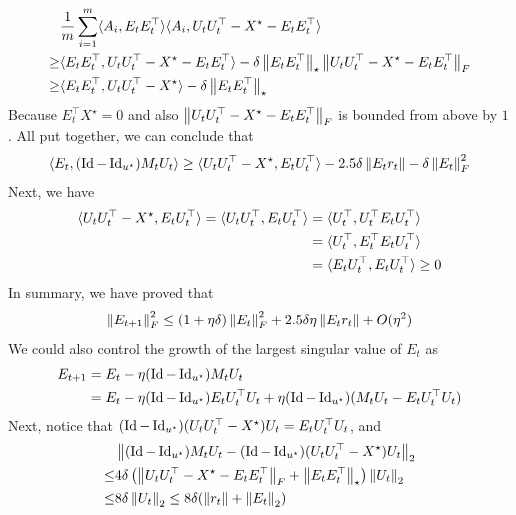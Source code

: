 \begin{align*}
    & \frac 1 m \sum_{i=1}^m \langle A_i, E_t E_t^{\top} \rangle \langle A_i, U_t U_t^{\top} - X^{\star} - E_t E_t^{\top} \rangle \\
    \ge& \langle E_t E_t^{\top}, U_t U_t^{\top} - X^{\star} - E_t E_t^{\top} \rangle - \delta \left\| E_t E_t^{\top} \right\|_{\star} \left\| U_t U_t^{\top} - X^{\star} - E_t E_t^{\top} \right\|_{F} \\
    \ge& \langle E_t E_t^{\top}, U_tU_t^{\top} - X^{\star} \rangle - \delta \left\| E_t E_t^{\top} \right\|_{\star}
\end{align*}
Because $E_t^{\top} X^{\star} = 0$ and also $\left\| U_t U_t^{\top} - X^{\star} - E_t E_t^{\top} \right\|_{F}$ is bounded from above by $1$.
All put together, we can conclude that
\begin{align*}
    \langle E_t, (\operatorname{Id} - \operatorname{Id}_{u^{\star}}) M_t U_t \rangle
    \ge \langle U_t U_t^{\top} - X^{\star}, E_t U_t^{\top} \rangle - 2.5\delta \left\| E_t r_t \right\| - \delta \left\| E_t \right\|_{F}^2
\end{align*}
Next, we have
\begin{align*}
    \langle U_t U_t^{\top} - X^{\star}, E_t U_t^{\top} \rangle
    = \langle U_t U_t^{\top}, E_t U_t^{\top} \rangle
    &= \langle U_t^{\top}, U_t^{\top} E_t U_t^{\top} \rangle \\
    &= \langle U_t^{\top}, E_t^{\top} E_t U_t^{\top} \rangle \\
    &= \langle E_t U_t^{\top}, E_t U_t^{\top} \rangle \ge 0
\end{align*}
In summary, we have proved that
\begin{align}
    \left\| E_{t+1} \right\|_{F}^2 \le (1 + \eta \delta) \left\| E_t \right\|_{F}^2 + 2.5\delta\eta \left\| E_t r_t \right\| + O(\eta^2)
\end{align}
We could also control the growth of the largest singular value of $E_t$ as
\begin{align}
    E_{t+1} &= E_t - \eta (\operatorname{Id} - \operatorname{Id}_{u^{\star}}) M_t U_t \\ 
    &= E_t - \eta (\operatorname{Id} - \operatorname{Id}_{u^{\star}}) E_t U_t^{\top} U_t + \eta(\operatorname{Id} - \operatorname{Id}_{u^{\star}}) (M_t U_t - E_t U_t^{\top} U_t)
\end{align}
Next, notice that $(\operatorname{Id} - \operatorname{Id}_{u^{\star}}) (U_t U_t^{\top} - X^{\star}) U_t = E_t U_t^{\top} U_t$, and
\begin{align*}
    & \left\| (\operatorname{Id} - \operatorname{Id}_{u^{\star}}) M_t U_t - (\operatorname{Id} - \operatorname{Id}_{u^{\star}}) (U_t U_t^{\top} - X^{\star}) U_t \right\|_{2} \\
    \le & 4 \delta \left(\left\| U_t U_t^{\top} - X^{\star} - E_t E_t^{\top} \right\|_{F} + \left\| E_t E_t^{\top} \right\|_{\star} \right) \left\| U_t \right\|_{2} \\
    \le & 8 \delta \left\| U_t \right\|_{2} \le 8 \delta (\left\| r_t \right\| + \left\| E_t \right\|_{2})
\end{align*}
